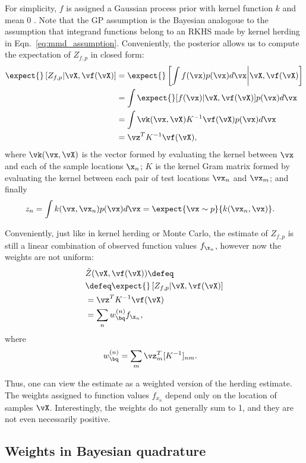 For simplicity, $f$ is assigned a Gaussian process prior with kernel function $k$ and mean $0$ \citep{Rasmussen2006}. Note that the GP assumption is the Bayesian analogoue to the assumption that integrand functions belong to an RKHS made by kernel herding in Eqn.\ \eqref{eq:mmd_assumption}. Conveniently, the \gp{} posterior allows us to compute the expectation of $Z_{f,p}$ in closed form: 
%
\begin{align}
	\expect{} \left[Z_{f,p} \vert \vX, \vf(\vX) \right] &= \expect{} \left[ {\int f(\vx)p(\vx)d\vx} \middle\vert \vX, \vf(\vX) \right]\\
	 & = \int \expect{} [f(\vx) \vert \vX, \vf(\vX) ] p(\vx) d\vx\\
	 & = \int \vk(\vx, \vX) K^{-1} \vf(\vX) p(\vx) d\vx \\
	 & = \vz^T K^{-1} \vf(\vX),
	\label{eq:marg_mean_symbolic}
\end{align}
%
where $\vk(\vx, \vX)$ is the vector formed by evaluating the kernel between $\vx$ and each of the sample locations $\x_n$; $K$ is the kernel Gram matrix formed by evaluating the kernel between each pair of test locations $\vx_n$ and $\vx_m$; and finally
%
\begin{align}
z_n & = \int k(\vx, \vx_n) p(\vx) d\vx = \expect{\vx \sim p}{k(\vx_n, \vx)}.
\end{align}

Conveniently, just like in kernel herding or Monte Carlo, the estimate of $Z_{f,p}$ is still a linear combination of observed function values $f_{\x_n}$, however now the weights are not uniform:
%
\begin{align}
	&\hat{Z}(\vX,\vf(\vX)) \defeq \\
	&\defeq \expect{} \left[Z_{f,p} \vert \vX, \vf(\vX) \right]\\
	&= \vz^T K^{-1} \vf(\vX) \\
	&= \sum_n w_{\bq}^{(n)} f_{\x_n},
\end{align}
%
where 
%
\begin{align}  
	w_{\bq}^{(n)} & = \sum_m \vz_m^T [K^{-1}]_{nm}.
	\label{eq:bq_weights}
\end{align}

Thus, one can view the \bq{} estimate as a weighted version of the herding estimate. The weights assigned to function values $f_{x_n}$ depend only on the location of samples $\vX$. Interestingly, the weights do not generally sum to 1, and they are not even necessarily positive.

\subsection{Weights in Bayesian quadrature}

